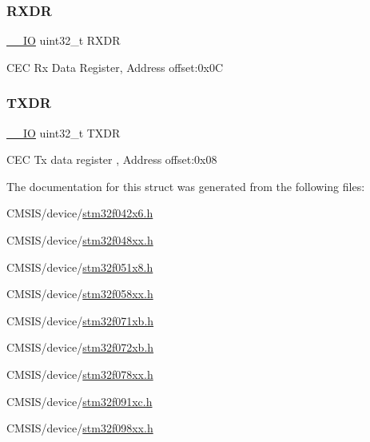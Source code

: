 \subsubsection{\texorpdfstring{R\+X\+DR}{RXDR}}
{\footnotesize\ttfamily \hyperlink{core__sc300_8h_aec43007d9998a0a0e01faede4133d6be}{\+\_\+\+\_\+\+IO} uint32\+\_\+t R\+X\+DR}

C\+EC Rx Data Register, Address offset\+:0x0C \mbox{\label{struct_c_e_c___type_def_ad7e8d785fff2acfeb8814e43bda8dd72}} 
\subsubsection{\texorpdfstring{T\+X\+DR}{TXDR}}
{\footnotesize\ttfamily \hyperlink{core__sc300_8h_aec43007d9998a0a0e01faede4133d6be}{\+\_\+\+\_\+\+IO} uint32\+\_\+t T\+X\+DR}

C\+EC Tx data register , Address offset\+:0x08 

The documentation for this struct was generated from the following files\+:\begin{DoxyCompactItemize}
\item 
C\+M\+S\+I\+S/device/\hyperlink{stm32f042x6_8h}{stm32f042x6.\+h}\item 
C\+M\+S\+I\+S/device/\hyperlink{stm32f048xx_8h}{stm32f048xx.\+h}\item 
C\+M\+S\+I\+S/device/\hyperlink{stm32f051x8_8h}{stm32f051x8.\+h}\item 
C\+M\+S\+I\+S/device/\hyperlink{stm32f058xx_8h}{stm32f058xx.\+h}\item 
C\+M\+S\+I\+S/device/\hyperlink{stm32f071xb_8h}{stm32f071xb.\+h}\item 
C\+M\+S\+I\+S/device/\hyperlink{stm32f072xb_8h}{stm32f072xb.\+h}\item 
C\+M\+S\+I\+S/device/\hyperlink{stm32f078xx_8h}{stm32f078xx.\+h}\item 
C\+M\+S\+I\+S/device/\hyperlink{stm32f091xc_8h}{stm32f091xc.\+h}\item 
C\+M\+S\+I\+S/device/\hyperlink{stm32f098xx_8h}{stm32f098xx.\+h}\end{DoxyCompactItemize}
